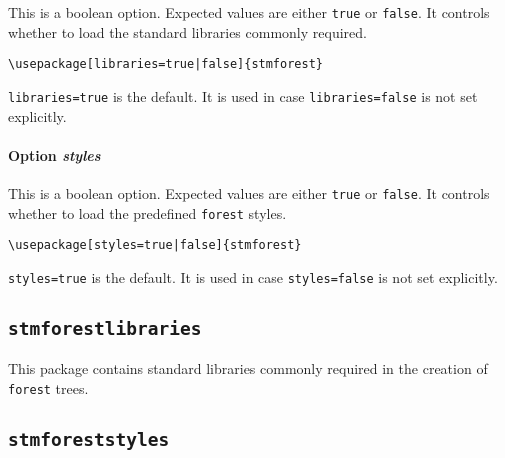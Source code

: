 \documentclass[%
  type=article,%
  layout=koma,%
  date=true,%
  hyperref=true,%
  listings=true,%
  forest=false,%
]{stmtext}
\begin{document}
This is a boolean option. Expected values are either \texttt{true} or \texttt{false}. It controls whether to load the standard libraries commonly required.

\begin{verbatim}
\usepackage[libraries=true|false]{stmforest}
\end{verbatim}

\texttt{libraries=true} is the default. It is used in case \texttt{libraries=false} is not set explicitly.

\paragraph{Option \protect\textit{styles}} 
\label{sec:usage:preamble:wholepackage:options:styles}

This is a boolean option. Expected values are either \texttt{true} or \texttt{false}. It controls whether to load the predefined \texttt{forest} styles.

\begin{verbatim}
\usepackage[styles=true|false]{stmforest}
\end{verbatim}

\texttt{styles=true} is the default. It is used in case \texttt{styles=false} is not set explicitly.

\subsection{\protect\texttt{stmforestlibraries}}
\label{sec:usage:preamble:libraries}


This package contains standard libraries commonly required in the creation of \texttt{forest} trees.


\subsection{\protect\texttt{stmforeststyles}}
\label{sec:usage:preamble:styles}
\end{document}
